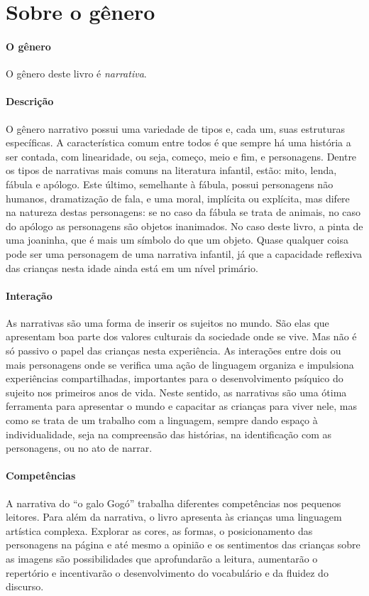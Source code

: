 \documentclass[11pt]{extarticle}
\begin{document}
\section{Sobre o gênero}

\paragraph{O gênero} O gênero deste livro é \textit{narrativa}. 

\paragraph{Descrição} 
O gênero narrativo possui uma variedade de tipos e, cada um, suas estruturas específicas.
A característica comum entre todos é que sempre há uma história a ser contada, com linearidade,
ou seja, começo, meio e fim, e personagens. 
Dentre os tipos de narrativas mais comuns na literatura infantil, estão: mito, lenda, 
fábula e apólogo. Este último, semelhante à fábula, possui personagens não humanos, 
dramatização de fala, e uma moral, implícita ou explícita, mas difere na natureza destas 
personagens: se no caso da fábula se trata de animais, no caso do apólogo as personagens 
são objetos inanimados. No caso deste livro, a pinta de uma joaninha, que é mais um 
símbolo do que um objeto. Quase qualquer coisa pode ser uma personagem de uma narrativa 
infantil, já que a capacidade reflexiva das crianças nesta idade ainda está em um nível primário. 


\paragraph{Interação} 
As narrativas são uma forma de inserir os sujeitos no mundo. 
São elas que apresentam boa parte dos valores culturais da sociedade 
onde se vive. Mas não é só passivo o papel das crianças nesta experiência. 
As interações entre dois ou mais personagens onde se verifica
uma ação de linguagem organiza e impulsiona experiências compartilhadas,
importantes para o desenvolvimento psíquico do sujeito nos primeiros anos de vida.
Neste sentido, as narrativas são uma ótima ferramenta para
apresentar o mundo e capacitar as crianças para viver nele, mas como se
trata de um trabalho com a linguagem, sempre dando espaço à individualidade, 
seja na compreensão das histórias, na identificação com as personagens, ou 
no ato de narrar. 

\paragraph{Competências} 
A narrativa do ``o galo Gogó'' trabalha diferentes competências
nos pequenos leitores. Para além da narrativa, o livro apresenta às crianças uma linguagem artística complexa.
Explorar as cores, as formas, o posicionamento das personagens 
na página e até mesmo a opinião e os sentimentos das crianças sobre as imagens 
são possibilidades que aprofundarão a leitura, aumentarão o repertório 
e incentivarão o desenvolvimento do vocabulário e da fluidez do discurso. 
\end{document}
